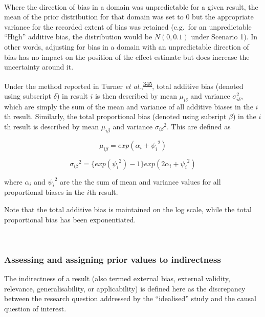\documentclass[a4paper, twoside]{templates/ociamthesis}
\begin{document}
~

Where the direction of bias in a domain was unpredictable for a given result, the mean of the prior distribution for that domain was set to 0 but the appropriate variance for the recorded extent of bias was retained (e.g.~for an unpredictable ``High'' additive bias, the distribution would be \(N(0,0.1)\) under Scenario 1). In other words, adjusting for bias in a domain with an unpredictable direction of bias has no impact on the position of the effect estimate but does increase the uncertainty around it.

Under the method reported in Turner \emph{et al.},\textsuperscript{\protect\hyperlink{ref-turner2009}{345}}, total additive bias (denoted using subscript \(\delta\)) in result \(i\) is then described by mean \(\mu_{i\delta}\) and variance \(\sigma_{i\delta}^{2}\), which are simply the sum of the mean and variance of all additive biases in the \(i\)th result. Similarly, the total proportional bias (denoted using subsript \(\beta\)) in the \(i\)th result is described by mean \(\mu_{i\beta}\) and variance \({\sigma_{i\beta}}^2\). This are defined as

\begin{equation}
  \mu_{i\beta} = exp(\alpha_{i} + {\psi_i}^2)
  \label{eq:prop-total-mean}
\end{equation}

\begin{equation}
  {\sigma_{i\beta}}^2 = \big\{ exp({\psi_{i}}^2)-1 \big\} exp({2}{\alpha_{i}} + {\psi_{i}}^2)
  \label{eq:prop-total-var}
\end{equation}

where \(\alpha_i\) and \({\psi_i}^2\) are the the sum of mean and variance values for all proportional biases in the \(i\)th result.

Note that the total additive bias is maintained on the log scale, while the total proportional bias has been exponentiated.

~

\hypertarget{assessing-and-assigning-prior-values-to-indirectness}{%
\subsubsection{Assessing and assigning prior values to indirectness}\label{assessing-and-assigning-prior-values-to-indirectness}}

The indirectness of a result (also termed external bias, external validity, relevance, generalisability, or applicability) is defined here as the discrepancy between the research question addressed by the ``idealised'' study and the causal question of interest.
\end{document}
